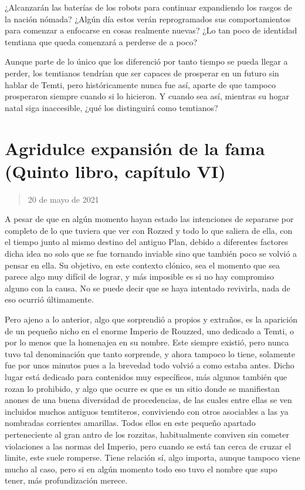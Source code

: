 \documentclass[
]{book}
\begin{document}
¿Alcanzarán las baterías de los robots para continuar expandiendo los rasgos de la nación nómada? ¿Algún día estos verán reprogramados sus comportamientos para comenzar a enfocarse en cosas realmente nuevas? ¿Lo tan poco de identidad temtiana que queda comenzará a perderse de a poco?

Aunque parte de lo único que los diferenció por tanto tiempo se pueda llegar a perder, los temtianos tendrían que ser capaces de prosperar en un futuro sin hablar de Temti, pero históricamente nunca fue así, aparte de que tampoco prosperaron siempre cuando si lo hicieron. Y cuando sea así, mientras su hogar natal siga inaccesible, ¿qué los distinguirá como temtianos?

\hypertarget{agridulce-expansiuxf3n-de-la-fama-quinto-libro-capuxedtulo-vi}{%
\section{Agridulce expansión de la fama (Quinto libro, capítulo VI)}\label{agridulce-expansiuxf3n-de-la-fama-quinto-libro-capuxedtulo-vi}}

\begin{quote}
20 de mayo de 2021
\end{quote}

A pesar de que en algún momento hayan estado las intenciones de separarse por completo de lo que tuviera que ver con Rozzed y todo lo que saliera de ella, con el tiempo junto al mismo destino del antiguo Plan, debido a diferentes factores dicha idea no solo que se fue tornando inviable sino que también poco se volvió a pensar en ella. Su objetivo, en este contexto clónico, sea el momento que sea parece algo muy difícil de lograr, y más imposible es si no hay compromiso alguno con la causa. No se puede decir que se haya intentado revivirla, nada de eso ocurrió últimamente.

Pero ajeno a lo anterior, algo que sorprendió a propios y extraños, es la aparición de un pequeño nicho en el enorme Imperio de Rouzzed, uno dedicado a Temti, o por lo menos que la homenajea en su nombre. Este siempre existió, pero nunca tuvo tal denominación que tanto sorprende, y ahora tampoco lo tiene, solamente fue por unos minutos pues a la brevedad todo volvió a como estaba antes. Dicho lugar está dedicado para contenidos muy específicos, más algunos también que rozan lo prohibido, y algo que ocurre es que es un sitio donde se manifiestan anones de una buena diversidad de procedencias, de las cuales entre ellas se ven incluidos muchos antiguos temtiteros, conviviendo con otros asociables a las ya nombradas corrientes amarillas. Todos ellos en este pequeño apartado perteneciente al gran antro de los rozzitas, habitualmente conviven sin cometer violaciones a las normas del Imperio, pero cuando se está tan cerca de cruzar el limite, este suele romperse. Tiene relación sí, algo importa, aunque tampoco viene mucho al caso, pero si en algún momento todo eso tuvo el nombre que supo tener, más profundización merece.
\end{document}
